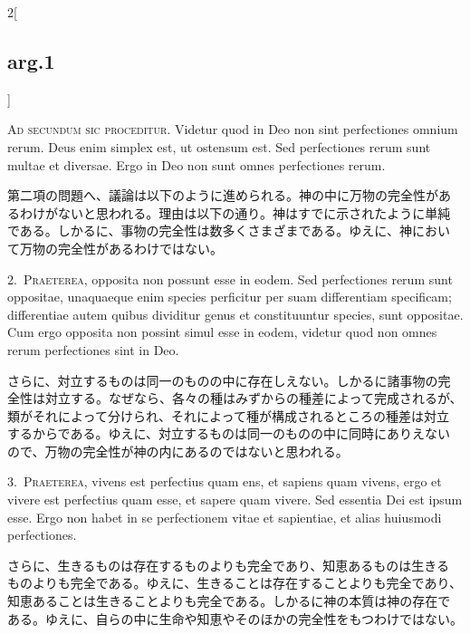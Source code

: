 \documentclass[paper=a4paper,fontsize=10pt,jafontsize=9pt,titlepage]{jlreq}
\begin{document}
\begin{paracol}{2}[\subsection{arg.1}]

{\huge A}{\scshape d secundum sic proceditur}. Videtur quod in Deo non
sint perfectiones omnium rerum. Deus enim simplex est, ut ostensum
est. Sed perfectiones rerum sunt multae et diversae. Ergo in Deo non
sunt omnes perfectiones rerum.

\switchcolumn

第二項の問題へ、議論は以下のように進められる。神の中に万物の完全性があ
るわけがないと思われる。理由は以下の通り。神はすでに示されたように単純
である。しかるに、事物の完全性は数多くさまざまである。ゆえに、神におい
て万物の完全性があるわけではない。


2.~{\scshape Praeterea}, opposita non possunt esse in eodem. Sed
perfectiones rerum sunt oppositae, unaquaeque enim species perficitur
per suam differentiam specificam; differentiae autem quibus dividitur
genus et constituuntur species, sunt oppositae. Cum ergo opposita non
possint simul esse in eodem, videtur quod non omnes rerum perfectiones
sint in Deo.

\switchcolumn

さらに、対立するものは同一のものの中に存在しえない。しかるに諸事物の完
全性は対立する。なぜなら、各々の種はみずからの種差によって完成されるが、
類がそれによって分けられ、それによって種が構成されるところの種差は対立
するからである。ゆえに、対立するものは同一のものの中に同時にありえない
ので、万物の完全性が神の内にあるのではないと思われる。


3.~{\scshape Praeterea}, vivens est perfectius quam ens, et sapiens
quam vivens, ergo et vivere est perfectius quam esse, et sapere quam
vivere. Sed essentia Dei est ipsum esse. Ergo non habet in se
perfectionem vitae et sapientiae, et alias huiusmodi perfectiones.

\switchcolumn

さらに、生きるものは存在するものよりも完全であり、知恵あるものは生きる
ものよりも完全である。ゆえに、生きることは存在することよりも完全であり、
知恵あることは生きることよりも完全である。しかるに神の本質は神の存在で
ある。ゆえに、自らの中に生命や知恵やそのほかの完全性をもつわけではない。


\end{paracol}
\end{document}
